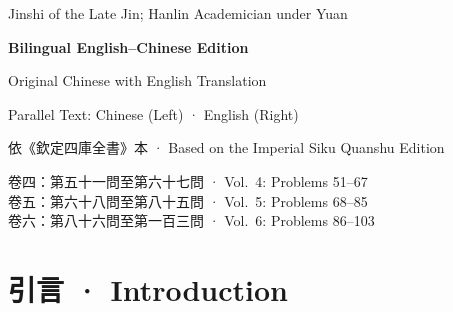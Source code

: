 \documentclass[9pt,a4paper]{article}
\begin{document}
\begin{titlepage}
\begin{center}
{\small\selectfont\color{notecolor} Jinshi of the Late Jin; Hanlin Academician under Yuan}

\vspace{2.5cm}

{\large\bfseries Bilingual English--Chinese Edition}

\vspace{0.3cm}

{\small\color{notecolor} Original Chinese with English Translation}

\vspace{0.2cm}

{\small\color{notecolor} Parallel Text: Chinese (Left) · English (Right)}

\vfill

{\small 依《欽定四庫全書》本 · Based on the Imperial Siku Quanshu Edition}

\vspace{0.3cm}

{\small\color{notecolor}
卷四：第五十一問至第六十七問 · Vol.\ 4: Problems 51--67\\[0.1cm]
卷五：第六十八問至第八十五問 · Vol.\ 5: Problems 68--85\\[0.1cm]
卷六：第八十六問至第一百三問 · Vol.\ 6: Problems 86--103\\[0.1cm]
}

\end{center}
\end{titlepage}

\tableofcontents
\newpage

\section*{引言 · Introduction}
\end{document}
